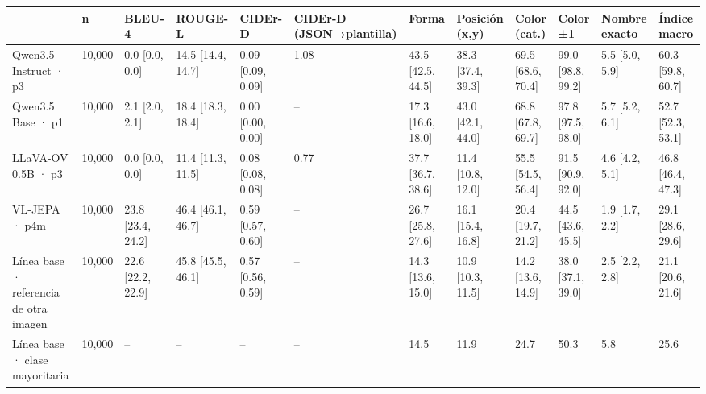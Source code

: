 \begin{tabular}{llllllllllll}
\toprule
 & n & BLEU-4 & ROUGE-L & CIDEr-D & CIDEr-D (JSON→plantilla) & Forma & Posición (x,y) & Color (cat.) & Color ±1 & Nombre exacto & Índice macro \\
\midrule
Qwen3.5 Instruct · p3 & 10,000 & 0.0 [0.0, 0.0] & 14.5 [14.4, 14.7] & 0.09 [0.09, 0.09] & 1.08 & 43.5 [42.5, 44.5] & 38.3 [37.4, 39.3] & 69.5 [68.6, 70.4] & 99.0 [98.8, 99.2] & 5.5 [5.0, 5.9] & 60.3 [59.8, 60.7] \\
Qwen3.5 Base · p1 & 10,000 & 2.1 [2.0, 2.1] & 18.4 [18.3, 18.4] & 0.00 [0.00, 0.00] & – & 17.3 [16.6, 18.0] & 43.0 [42.1, 44.0] & 68.8 [67.8, 69.7] & 97.8 [97.5, 98.0] & 5.7 [5.2, 6.1] & 52.7 [52.3, 53.1] \\
LLaVA-OV 0.5B · p3 & 10,000 & 0.0 [0.0, 0.0] & 11.4 [11.3, 11.5] & 0.08 [0.08, 0.08] & 0.77 & 37.7 [36.7, 38.6] & 11.4 [10.8, 12.0] & 55.5 [54.5, 56.4] & 91.5 [90.9, 92.0] & 4.6 [4.2, 5.1] & 46.8 [46.4, 47.3] \\
VL-JEPA · p4m & 10,000 & 23.8 [23.4, 24.2] & 46.4 [46.1, 46.7] & 0.59 [0.57, 0.60] & – & 26.7 [25.8, 27.6] & 16.1 [15.4, 16.8] & 20.4 [19.7, 21.2] & 44.5 [43.6, 45.5] & 1.9 [1.7, 2.2] & 29.1 [28.6, 29.6] \\
Línea base · referencia de otra imagen & 10,000 & 22.6 [22.2, 22.9] & 45.8 [45.5, 46.1] & 0.57 [0.56, 0.59] & – & 14.3 [13.6, 15.0] & 10.9 [10.3, 11.5] & 14.2 [13.6, 14.9] & 38.0 [37.1, 39.0] & 2.5 [2.2, 2.8] & 21.1 [20.6, 21.6] \\
Línea base · clase mayoritaria & 10,000 & – & – & – & – & 14.5 & 11.9 & 24.7 & 50.3 & 5.8 & 25.6 \\
\bottomrule
\end{tabular}
